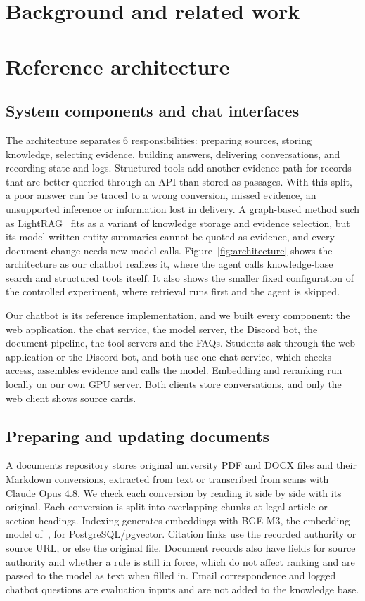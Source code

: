 \documentclass[a4paper,10pt,twocolumn]{article}
\begin{document}
\section{Background and related work}


\section{Reference architecture}
\subsection{System components and chat interfaces}
The architecture separates 6 responsibilities: preparing sources, storing knowledge, selecting evidence, building answers, delivering conversations, and recording state and logs. Structured tools add another evidence path for records that are better queried through an API than stored as passages. With this split, a poor answer can be traced to a wrong conversion, missed evidence, an unsupported inference or information lost in delivery. A graph-based method such as LightRAG~\cite{guo2024lightrag} fits as a variant of knowledge storage and evidence selection, but its model-written entity summaries cannot be quoted as evidence, and every document change needs new model calls. Figure~\ref{fig:architecture} shows the architecture as our chatbot realizes it, where the agent calls knowledge-base search and structured tools itself. It also shows the smaller fixed configuration of the controlled experiment, where retrieval runs first and the agent is skipped.



Our chatbot is its reference implementation, and we built every component: the web application, the chat service, the model server, the Discord bot, the document pipeline, the tool servers and the FAQs. Students ask through the web application or the Discord bot, and both use one chat service, which checks access, assembles evidence and calls the model. Embedding and reranking run locally on our own GPU server. Both clients store conversations, and only the web client shows source cards.

\subsection{Preparing and updating documents}
A documents repository stores original university PDF and DOCX files and their Markdown conversions, extracted from text or transcribed from scans with Claude Opus 4.8. We check each conversion by reading it side by side with its original. Each conversion is split into overlapping chunks at legal-article or section headings. Indexing generates embeddings with BGE-M3, the embedding model of~\cite{chen2024m3}, for PostgreSQL/pgvector. Citation links use the recorded authority or source URL, or else the original file. Document records also have fields for source authority and whether a rule is still in force, which do not affect ranking and are passed to the model as text when filled in. Email correspondence and logged chatbot questions are evaluation inputs and are not added to the knowledge base.
\end{document}
